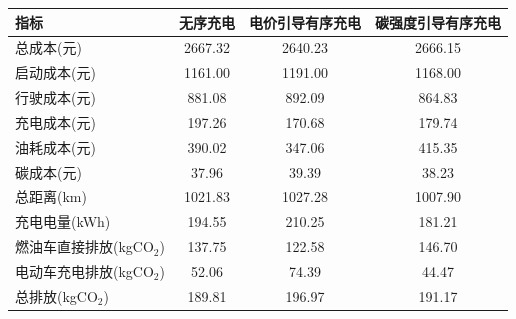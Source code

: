   \begin{tabular*}{\textwidth}{@{\extracolsep{\fill}}lccc@{}}
    \toprule
    指标 & 无序充电 & 电价引导有序充电 & 碳强度引导有序充电\\
    \midrule
    总成本(元) & 2667.32 & 2640.23 & 2666.15\\
    启动成本(元) & 1161.00 & 1191.00 & 1168.00\\
    行驶成本(元) & 881.08 & 892.09 & 864.83\\
    充电成本(元) & 197.26 & 170.68 & 179.74\\
    油耗成本(元) & 390.02 & 347.06 & 415.35\\
    碳成本(元) & 37.96 & 39.39 & 38.23\\
    总距离(km) & 1021.83 & 1027.28 & 1007.90\\
    充电电量(kWh) & 194.55 & 210.25 & 181.21\\
    燃油车直接排放(kgCO$_2$) & 137.75 & 122.58 & 146.70\\
    电动车充电排放(kgCO$_2$) & 52.06 & 74.39 & 44.47\\
    总排放(kgCO$_2$) & 189.81 & 196.97 & 191.17\\
    \bottomrule
  \end{tabular*}
